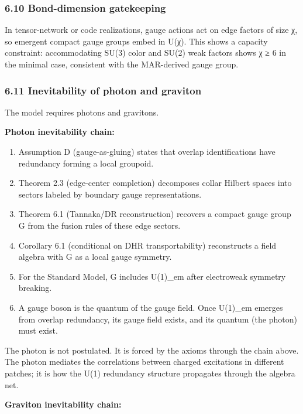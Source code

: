 \subsubsection{6.10 Bond-dimension gatekeeping}\label{610-bond-dimension-gatekeeping}

In tensor-network or code realizations, gauge actions act on edge factors of size χ, so emergent compact gauge groups embed in U(χ). This shows a capacity constraint: accommodating SU(3) color and SU(2) weak factors shows χ ≥ 6 in the minimal case, consistent with the MAR-derived gauge group.

\subsubsection{6.11 Inevitability of photon and graviton}\label{611-inevitability-of-photon-and-graviton}

The model requires photons and gravitons.

\textbf{Photon inevitability chain:}

\begin{enumerate}
\def\labelenumi{\arabic{enumi}.}
\tightlist
\item
  Assumption D (gauge-as-gluing) states that overlap identifications have redundancy forming a local groupoid.
\item
  Theorem 2.3 (edge-center completion) decomposes collar Hilbert spaces into sectors labeled by boundary gauge representations.
\item
  Theorem 6.1 (Tannaka/DR reconstruction) recovers a compact gauge group G from the fusion rules of these edge sectors.
\item
  Corollary 6.1 (conditional on DHR transportability) reconstructs a field algebra with G as a local gauge symmetry.
\item
  For the Standard Model, G includes U(1)\_em after electroweak symmetry breaking.
\item
  A gauge boson is the quantum of the gauge field. Once U(1)\_em emerges from overlap redundancy, its gauge field exists, and its quantum (the photon) must exist.
\end{enumerate}

The photon is not postulated. It is forced by the axioms through the chain above. The photon mediates the correlations between charged excitations in different patches; it is how the U(1) redundancy structure propagates through the algebra net.

\textbf{Graviton inevitability chain:}

